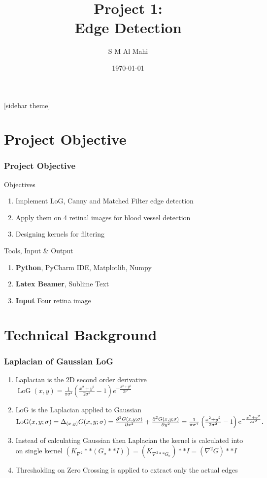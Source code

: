 \documentclass[11pt]{beamer}
\author{S M Al Mahi}
\title[ECEN-5283 Computer Vision]{Project 1: \\Edge Detection}
\institute{Oklahoma State University}
\date{\today}
\begin{document}
\begin{frame}
\titlepage
\end{frame}

\newpage
{}[sidebar theme]
\section{Project Objective}
\begin{frame}
\frametitle{Project Objective}
	\begin{block}{Objectives}
	\begin{enumerate}
		\item Implement LoG, Canny and Matched Filter edge detection
		\item Apply them on 4 retinal images for blood vessel detection
		\item Designing kernels for filtering
	\end{enumerate}
	\end{block}
	\begin{block}{Tools, Input \& Output}
	\begin{enumerate}
		\item \textbf{Python}, PyCharm IDE, Matplotlib, Numpy
		\item \textbf{Latex Beamer}, Sublime Text
		\item \textbf{Input} Four retina image
	\end{enumerate}
	\end{block}
\end{frame}

\section{Technical Background}
\begin{frame}
\frametitle{Laplacian of Gaussian \textbf{LoG}}
	\begin{enumerate}
		\item Laplacian is the 2D second order derivative  $\operatorname{LoG}(x,y) = \frac{1}{\pi\sigma^4}\left(\frac{x^2+y^2}{2\sigma^2} - 1\right)e^{-\frac{x^2+y^2}{2\sigma^2}}$
		\item LoG is the Laplacian applied to Gaussian ${\rm LoG}(x,y;\sigma)
=
\Delta_{(x,y)}G(x,y;\sigma)
=
\frac{\partial^2 G(x,y;\sigma)}{\partial x^2} + \frac{\partial^2 G(x,y;\sigma)}{\partial y^2}
=
\frac{1}{\pi\sigma^4} \left(\frac{x^2+y^2}{2\sigma^2}-1\right){\rm e}^{-\frac{x^2+y^2}{2\sigma^2}} .$
		\item Instead of calculating Gaussian then Laplacian the kernel is calculated into on single kernel $(K_{\nabla^2}**(G_\sigma **I)) = (K_{\nabla^2**G_\sigma})**I = (\nabla^2G)**I$ 
		\item Thresholding on Zero Crossing is applied to extract only the actual edges 
	\end{enumerate}
\end{frame}
\end{document}
